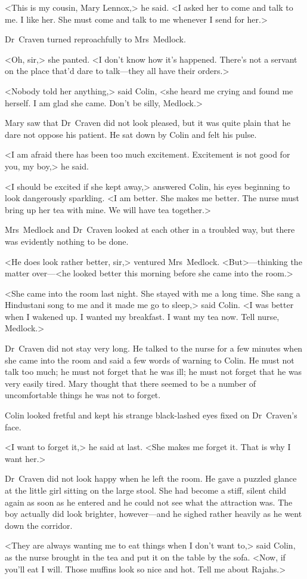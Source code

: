 <This is my cousin, Mary Lennox,> he said. <I asked her to come and talk to me. I like her. She must come and talk to me whenever I send for her.>

Dr~Craven turned reproachfully to Mrs~Medlock.

<Oh, sir,> she panted. <I don't know how it's happened. There's not a servant on the place that'd dare to talk—they all have their orders.>

<Nobody told her anything,> said Colin, <she heard me crying and found me herself. I am glad she came. Don't be silly, Medlock.>

Mary saw that Dr~Craven did not look pleased, but it was quite plain that he dare not oppose his patient. He sat down by Colin and felt his pulse.

<I am afraid there has been too much excitement. Excitement is not good for you, my boy,> he said.

<I should be excited if she kept away,> answered Colin, his eyes beginning to look dangerously sparkling. <I am better. She makes me better. The nurse must bring up her tea with mine. We will have tea together.>

Mrs~Medlock and Dr~Craven looked at each other in a troubled way, but there was evidently nothing to be done.

<He does look rather better, sir,> ventured Mrs~Medlock. <But>—thinking the matter over—<he looked better this morning before she came into the room.>

<She came into the room last night. She stayed with me a long time. She sang a Hindustani song to me and it made me go to sleep,> said Colin. <I was better when I wakened up. I wanted my breakfast. I want my tea now. Tell nurse, Medlock.>

Dr~Craven did not stay very long. He talked to the nurse for a few minutes when she came into the room and said a few words of warning to Colin. He must not talk too much; he must not forget that he was ill; he must not forget that he was very easily tired. Mary thought that there seemed to be a number of uncomfortable things he was not to forget.

Colin looked fretful and kept his strange black-lashed eyes fixed on Dr~Craven's face.

<I want to forget it,> he said at last. <She makes me forget it. That is why I want her.>

Dr~Craven did not look happy when he left the room. He gave a puzzled glance at the little girl sitting on the large stool. She had become a stiff, silent child again as soon as he entered and he could not see what the attraction was. The boy actually did look brighter, however—and he sighed rather heavily as he went down the corridor.

<They are always wanting me to eat things when I don't want to,> said Colin, as the nurse brought in the tea and put it on the table by the sofa. <Now, if you'll eat I will. Those muffins look so nice and hot. Tell me about Rajahs.>